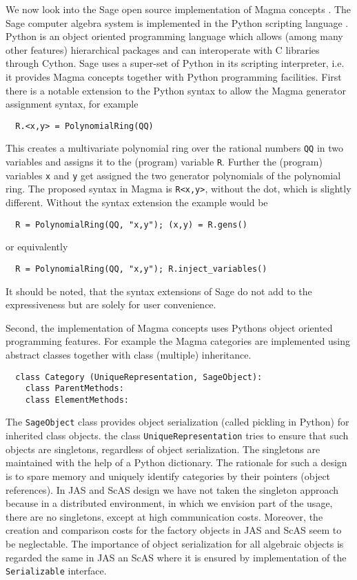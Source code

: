 \documentclass{llncs}
\newcommand{\code}[1]{\texttt{#1}}
\begin{document}
We now look into the Sage open source implementation of Magma concepts
\cite{Stein:2005,SageWiki:2009}.  The Sage computer algebra system is
implemented in the Python scripting language \cite{vanRossum:1991}.
Python is an object oriented programming language which allows (among
many other features) hierarchical packages and can interoperate with C
libraries through Cython. Sage uses a super-set of Python in its
scripting interpreter, i.e. it provides Magma concepts together with
Python programming facilities. First there is a notable extension to
the Python syntax to allow the Magma generator assignment syntax, for
example
\begin{verbatim}
  R.<x,y> = PolynomialRing(QQ)
\end{verbatim}
This creates a multivariate polynomial ring over the rational numbers
\code{QQ} in two variables and assigns it to the (program) variable
\code{R}. Further the (program) variables \code{x} and \code{y} get
assigned the two generator polynomials of the polynomial ring. The
proposed syntax in Magma is \code{R<x,y>}, without the dot, which is
slightly different.  Without the syntax extension the example
would be
\begin{verbatim}
  R = PolynomialRing(QQ, "x,y"); (x,y) = R.gens()
\end{verbatim}
or equivalently
\begin{verbatim}
  R = PolynomialRing(QQ, "x,y"); R.inject_variables()
\end{verbatim}
It should be noted, that the syntax extensions of Sage do not add to
the expressiveness but are solely for user convenience.

Second, the implementation of Magma concepts uses Pythons object oriented
programming features. For example the Magma categories are implemented
using abstract classes together with class (multiple) inheritance.
\begin{verbatim}
  class Category (UniqueRepresentation, SageObject):
    class ParentMethods:
    class ElementMethods:
\end{verbatim}
The \code{SageObject} class provides object serialization (called
pickling in Python) for inherited class objects. the class
\code{UniqueRepresentation} tries to ensure that such objects are
singletons, regardless of object serialization. The singletons are
maintained with the help of a Python dictionary.  The rationale for
such a design is to spare memory and uniquely identify categories by
their pointers (object references). 
%
In JAS and ScAS design we have not taken the singleton approach
because in a distributed environment, in which we envision part of the
usage, there are no singletons, except at high communication costs.
Moreover, the creation and comparison costs for the factory objects in
JAS and ScAS seem to be neglectable. The importance of object
serialization for all algebraic objects is regarded the same in JAS an
ScAS where it is ensured by implementation of the \code{Serializable}
interface.
\end{document}
